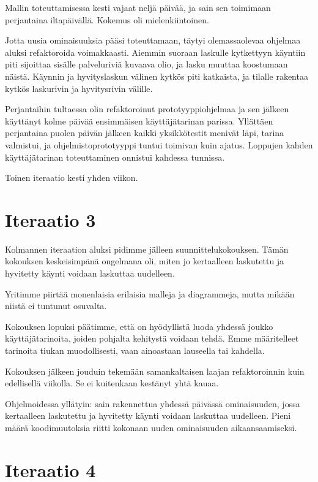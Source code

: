 Mallin toteuttamisessa kesti vajaat neljä päivää, ja sain sen toimimaan
perjantaina iltapäivällä. Kokemus oli mielenkiintoinen.

Jotta uusia ominaisuuksia pääsi toteuttamaan, täytyi olemassaolevaa
ohjelmaa aluksi refaktoroida voimakkaasti. Aiemmin suoraan laskulle
kytkettyyn käyntiin piti sijoittaa sisälle palveluriviä kuvaava olio, ja
lasku muuttaa koostumaan näistä. Käynnin ja hyvityslaskun välinen kytkös
piti katkaista, ja tilalle rakentaa kytkös laskurivin ja hyvitysrivin
välille.

Perjantaihin tultaessa olin refaktoroinut prototyyppiohjelmaa ja sen
jälkeen käyttänyt kolme päivää ensimmäisen käyttäjätarinan parissa.
Yllättäen perjantaina puolen päivän jälkeen kaikki yksikkötestit menivät
läpi, tarina valmistui, ja ohjelmistoprototyyppi tuntui toimivan kuin
ajatus. Loppujen kahden käyttäjätarinan toteuttaminen onnistui kahdessa
tunnissa.

Toinen iteraatio kesti yhden viikon.

\hypertarget{iteraatio-3}{%
\section{Iteraatio 3}\label{iteraatio-3}}

Kolmannen iteraation aluksi pidimme jälleen suunnittelukokouksen. Tämän
kokouksen keskeisimpänä ongelmana oli, miten jo kertaalleen laskutettu
ja hyvitetty käynti voidaan laskuttaa uudelleen.

Yritimme piirtää monenlaisia erilaisia malleja ja diagrammeja, mutta
mikään niistä ei tuntunut osuvalta.

Kokouksen lopuksi päätimme, että on hyödyllistä luoda yhdessä joukko
käyttäjätarinoita, joiden pohjalta kehitystä voidaan tehdä. Emme
määritelleet tarinoita tiukan muodollisesti, vaan ainoastaan lauseella
tai kahdella.

Kokouksen jälkeen jouduin tekemään samankaltaisen laajan refaktoroinnin
kuin edellisellä viikolla. Se ei kuitenkaan kestänyt yhtä kauaa.

Ohjelmoidessa yllätyin: sain rakennettua yhdessä päivässä ominaisuuden,
jossa kertaalleen laskutettu ja hyvitetty käynti voidaan laskuttaa
uudelleen. Pieni määrä koodimuutoksia riitti kokonaan uuden ominaisuuden
aikaansaamiseksi.

\hypertarget{iteraatio-4}{%
\section{Iteraatio 4}\label{iteraatio-4}}

